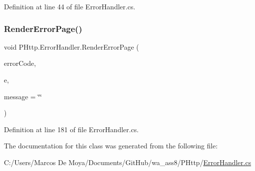 Definition at line 44 of file Error\+Handler.\+cs.

\mbox{\label{class_p_http_1_1_error_handler_ab2c5ad53251abe6a4f23f782dcd27498}} 
\subsubsection{\texorpdfstring{Render\+Error\+Page()}{RenderErrorPage()}\hspace{0.1cm}{\footnotesize\ttfamily [2/2]}}
{\footnotesize\ttfamily void P\+Http.\+Error\+Handler.\+Render\+Error\+Page (\begin{DoxyParamCaption}\item[{int}]{error\+Code,  }\item[{\hyperlink{class_p_http_1_1_http_context}{Http\+Context}}]{e,  }\item[{string}]{message = {\ttfamily \char`\"{}\char`\"{}} }\end{DoxyParamCaption})}



Definition at line 181 of file Error\+Handler.\+cs.



The documentation for this class was generated from the following file\+:\begin{DoxyCompactItemize}
\item 
C\+:/\+Users/\+Marcos De Moya/\+Documents/\+Git\+Hub/wa\+\_\+ass8/\+P\+Http/\hyperlink{_p_http_2_error_handler_8cs}{Error\+Handler.\+cs}\end{DoxyCompactItemize}
